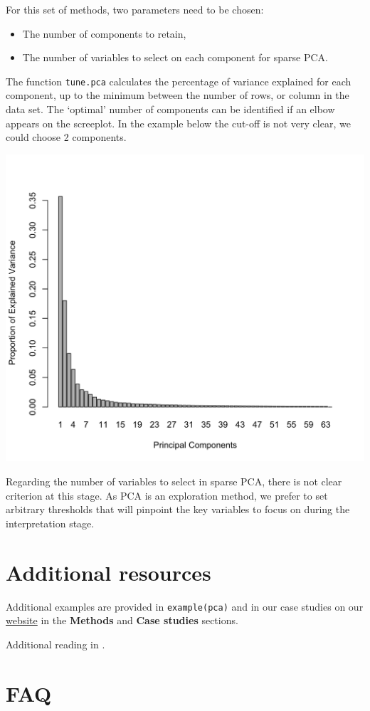 \documentclass[]{book}
\providecommand{\tightlist}{%
  \setlength{\itemsep}{0pt}\setlength{\parskip}{0pt}}
\theoremstyle{definition}
\theoremstyle{definition}
\theoremstyle{definition}
\theoremstyle{remark}
\begin{document}
For this set of methods, two parameters need to be chosen:

\begin{itemize}
\tightlist
\item
  The number of components to retain,
\item
  The number of variables to select on each component for sparse PCA.
\end{itemize}

The function \texttt{tune.pca} calculates the percentage of variance
explained for each component, up to the minimum between the number of
rows, or column in the data set. The `optimal' number of components can
be identified if an elbow appears on the screeplot. In the example below
the cut-off is not very clear, we could choose 2 components.

\begin{center}\includegraphics[width=0.5\linewidth]{Figures/unnamed-chunk-14-1} \end{center}

Regarding the number of variables to select in sparse PCA, there is not
clear criterion at this stage. As PCA is an exploration method, we
prefer to set arbitrary thresholds that will pinpoint the key variables
to focus on during the interpretation stage.

\section{Additional resources}\label{additional-resources}

Additional examples are provided in \texttt{example(pca)} and in our
case studies on our \href{http://www.mixomics.org}{website} in the
\textbf{Methods} and \textbf{Case studies} sections.

Additional reading in \citep{She08}.

\section{FAQ}\label{faq}
\end{document}
